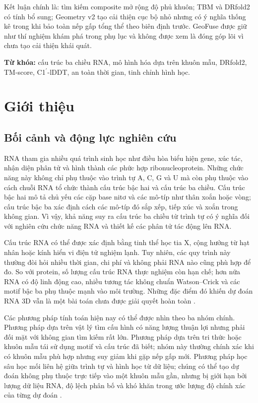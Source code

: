 \documentclass[12pt,a4paper,oneside]{report}
\newcommand{\cprime}{C1$^{\prime}$}
\begin{document}
Kết luận chính là: tìm kiếm composite mở rộng độ phủ khuôn; TBM và DRfold2 có tính bổ
sung; Geometry v2 tạo cải thiện cục bộ nhỏ nhưng có ý nghĩa thống kê trong khi bảo toàn
nếp gấp tổng thể theo biên định trước. GeoFuse được giữ như thí nghiệm khám phá trong
phụ lục và không được xem là đóng góp lõi vì chưa tạo cải thiện khái quát.

\noindent\textbf{Từ khóa:} cấu trúc ba chiều RNA, mô hình hóa dựa trên khuôn mẫu,
DRfold2, TM-score, \cprime{}-lDDT, an toàn thời gian, tinh chỉnh hình học.

\tableofcontents
\listoftables
\listoffigures
\clearpage
{}

\chapter{Giới thiệu}

\section{Bối cảnh và động lực nghiên cứu}

RNA tham gia nhiều quá trình sinh học như điều hòa biểu hiện gene, xúc tác, nhận diện
phân tử và hình thành các phức hợp ribonucleoprotein. Những chức năng này không chỉ phụ
thuộc vào trình tự A, C, G và U mà còn phụ thuộc vào cách chuỗi RNA tổ chức thành cấu
trúc bậc hai và cấu trúc ba chiều. Cấu trúc bậc hai mô tả chủ yếu các cặp base nitơ và
các mô-típ như thân xoắn hoặc vòng; cấu trúc bậc ba xác định cách các mô-típ đó sắp xếp,
tiếp xúc và xoắn
trong không gian. Vì vậy, khả năng suy ra cấu trúc ba chiều từ trình tự có ý nghĩa đối
với nghiên cứu chức năng RNA và thiết kế các phân tử tác động lên RNA.

Cấu trúc RNA có thể được xác định bằng tinh thể học tia X, cộng hưởng từ hạt nhân hoặc
kính hiển vi điện tử nghiệm lạnh. Tuy nhiên, các quy trình này thường đòi hỏi nhiều thời
gian, chi phí và không phải RNA nào cũng phù hợp để đo. So với protein, số lượng cấu trúc
RNA thực nghiệm còn hạn chế; hơn nữa RNA có độ linh động cao, nhiều tương tác không chuẩn
Watson--Crick và các motif bậc ba phụ thuộc mạnh vào môi trường. Những đặc điểm đó khiến
dự đoán RNA 3D vẫn là một bài toán chưa được giải quyết hoàn toàn
\cite{rna_puzzles,rna_progress_review,state_of_rnart}.

Các phương pháp tính toán hiện nay có thể được nhìn theo ba nhóm chính. Phương pháp dựa
trên vật lý tìm cấu hình có năng lượng thuận lợi nhưng phải đối mặt với không gian tìm
kiếm rất lớn. Phương pháp dựa trên tri thức hoặc khuôn mẫu tái sử dụng motif và cấu trúc
đã biết; nhóm này thường chính xác khi có khuôn mẫu phù hợp nhưng suy giảm khi gặp nếp
gấp mới. Phương pháp học sâu học mối liên hệ giữa trình tự và hình học từ dữ liệu; chúng
có thể tạo dự đoán không phụ thuộc trực tiếp vào một khuôn mẫu gần, nhưng bị giới hạn
bởi lượng dữ liệu RNA, độ lệch phân bố và khó khăn trong ước lượng độ chính xác của từng
dự đoán \cite{drfold,rhofoldplus,drfold2,ares}.
\end{document}
